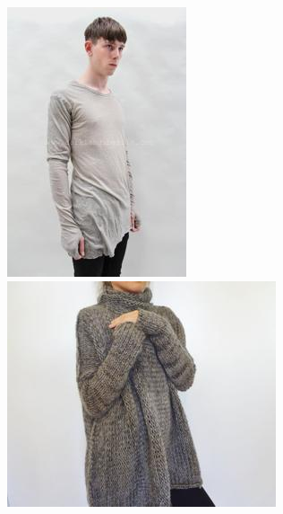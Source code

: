 \documentclass{article}
\begin{document}
\begin{figure}[ht]
    \centering
    \begin{minipage}[b]{0.2\linewidth}
        \centering
        \includegraphics[width=\linewidth]{imgs/00000.jpg}
    \end{minipage}
    \hfill
    \begin{minipage}[b]{0.2\linewidth}
        \centering
        \includegraphics[width=\linewidth]{imgs/00001.jpg}

\end{minipage}
\end{figure}
\end{document}

